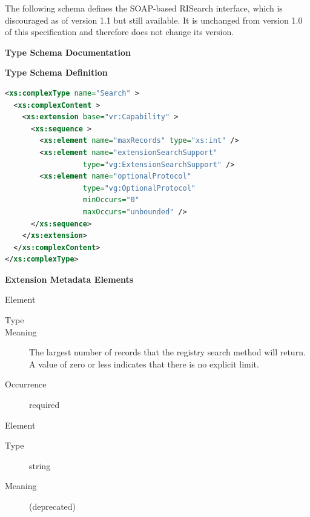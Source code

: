 \documentclass{ivoa}
\begin{document}
The following schema defines the SOAP-based RISearch interface, which
is discouraged as of version 1.1 but still available. 
It is unchanged from version 1.0 of this specification
and therefore does not change its version.

\begin{generated}
\begingroup
      	\renewcommand*\descriptionlabel[1]{%
      	\hbox to 5.5em{\emph{#1}\hfil}}\vspace{2ex}\noindent\textbf{ Type Schema Documentation}


\vspace{1ex}\noindent\textbf{ Type Schema Definition}

\begin{lstlisting}[language=XML,basicstyle=\footnotesize]
<xs:complexType name="Search" >
  <xs:complexContent >
    <xs:extension base="vr:Capability" >
      <xs:sequence >
        <xs:element name="maxRecords" type="xs:int" />
        <xs:element name="extensionSearchSupport"
                  type="vg:ExtensionSearchSupport" />
        <xs:element name="optionalProtocol"
                  type="vg:OptionalProtocol"
                  minOccurs="0"
                  maxOccurs="unbounded" />
      </xs:sequence>
    </xs:extension>
  </xs:complexContent>
</xs:complexType>
\end{lstlisting}

\vspace{0.5ex}\noindent\textbf{ Extension Metadata Elements}

\begingroup\small\begin{bigdescription}\item[Element \xmlel{maxRecords}]
\begin{description}
\item[Type] 
\item[Meaning] 
                        The largest number of records that the registry search
                        method will return.  A value of zero or less indicates
                        that there is no explicit limit.  
                     
\item[Occurrence] required

\end{description}
\item[Element \xmlel{extensionSearchSupport}]
\begin{description}
\item[Type] string
\item[Meaning] 
                     	(deprecated)
                     

\end{description}
\end{bigdescription}
\end{generated}
\end{document}
